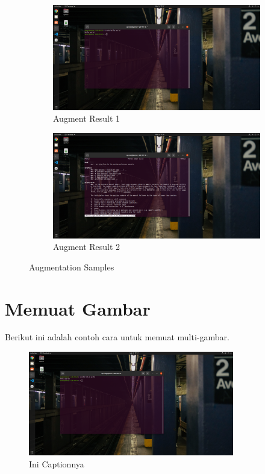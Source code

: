 \documentclass[11pt,a4paper]{article}
\begin{document}
\begin{figure}[h]
	\centering
	\begin{subfigure}[b]{0.4\textwidth}
		\centering
		\def\svgwidth{\columnwidth}
		\includegraphics[width=1\textwidth]{figure/tut1_bagian1.png}
		\caption{Augment Result 1}
		\label{fig:aug-1}
	\end{subfigure}
	\qquad %
	\begin{subfigure}[b]{0.4\textwidth}
		\centering
		\def\svgwidth{\columnwidth}
		\includegraphics[width=1\textwidth]{figure/tut1_bagian2.png}
		\caption{Augment Result 2}
		\label{fig:aug-2}
	\end{subfigure}
	\caption{Augmentation Samples}\label{fig:aug}
\end{figure}


\newpage
\section{Memuat Gambar}
Berikut ini adalah contoh cara untuk memuat multi-gambar.
\begin{figure}[h]
    \centering
    \includegraphics[width=0.8\textwidth]{figure/tut1_bagian1.png}
    \caption{Ini Captionnya}
    \label{fig:my_label}
\end{figure}

\newpage


\end{document}
